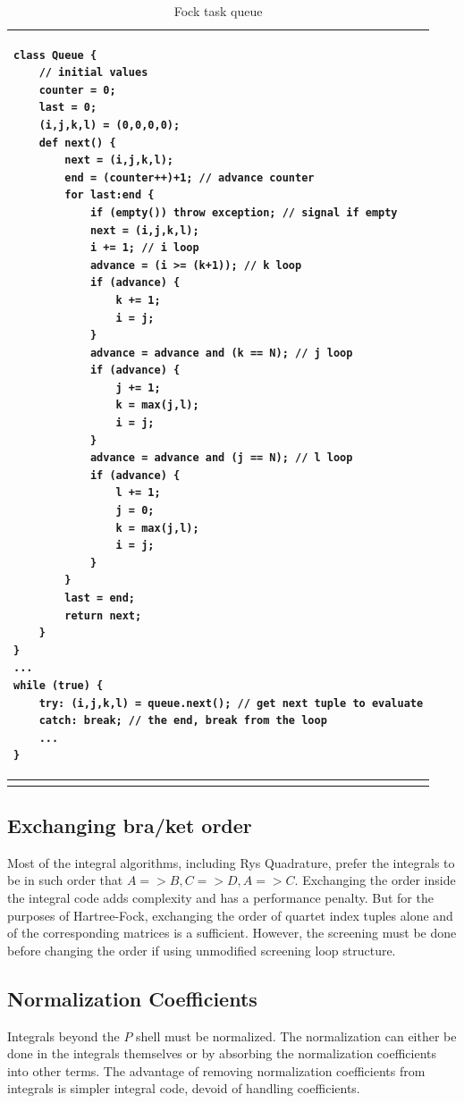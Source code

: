 \documentclass[12pt]{article}
\begin{document}
\begin{table}
\begin{tabular}{ p{6in} }
\hline
\begin{verbatim}
class Queue {
    // initial values
    counter = 0;
    last = 0;
    (i,j,k,l) = (0,0,0,0); 
    def next() {
        next = (i,j,k,l);
        end = (counter++)+1; // advance counter
        for last:end {
            if (empty()) throw exception; // signal if empty
            next = (i,j,k,l);
            i += 1; // i loop
            advance = (i >= (k+1)); // k loop
            if (advance) {
                k += 1;
                i = j;
            }
            advance = advance and (k == N); // j loop
            if (advance) {
                j += 1;
                k = max(j,l);
                i = j;
            }
            advance = advance and (j == N); // l loop
            if (advance) {
                l += 1;
                j = 0;
                k = max(j,l);
                i = j;
            }
        }
        last = end;
        return next;
    }
}
...
while (true) {
    try: (i,j,k,l) = queue.next(); // get next tuple to evaluate
    catch: break; // the end, break from the loop
    ...
}
\end{verbatim} \\
\hline

\label{Fock:task}
\caption{Fock task queue}
\end{tabular}
\end{table}


\subsection*{Exchanging bra/ket order}
Most of the integral algorithms, including Rys Quadrature, prefer the
integrals to be in such order that $A => B, C => D, A => C$.
Exchanging the order inside the integral code adds complexity and has a
performance penalty.  But for the purposes of Hartree-Fock, exchanging
the order of quartet index tuples alone and of the corresponding matrices is a
sufficient.  However, the screening must be done before changing the
order if using unmodified screening loop structure.


\subsection*{Normalization Coefficients}
Integrals beyond the $P$ shell must be normalized.  The normalization
can either be done in the integrals themselves or by absorbing the
normalization coefficients into other terms.  The advantage of
removing normalization coefficients from integrals is simpler integral
code, devoid of handling coefficients.
\end{document}
